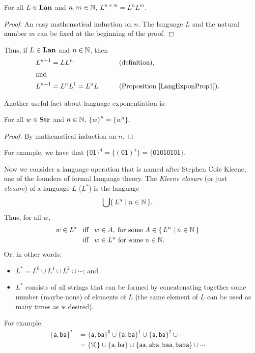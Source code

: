 \begin{proposition}
\label{LangExponProp1}
For all $L\in\mathbf{Lan}$ and $n,m\in\mathbb{N}$, $L^{n+m}=L^nL^m$.
\end{proposition}

\begin{proof}
An easy mathematical induction on $n$.  The language $L$ and the natural
number $m$ can be fixed at the beginning of the proof.
\end{proof}

Thus, if $L\in\mathbf{Lan}$ and $n\in\mathbb{N}$, then
\begin{alignat*}{2}
L^{n+1} &= LL^n && \qquad{\textrm{(definition)}}, \\
\intertext{and}
L^{n+1} &= L^nL^1 = L^nL && \qquad{\textrm{(Proposition~\ref{LangExponProp1})}} .
\end{alignat*}

Another useful fact about language exponentiation is:

\begin{proposition}
\label{LangExponProp2}
For all $w\in\mathbf{Str}$ and $n\in\mathbb{N}$, $\{w\}^n = \{w^n\}$.
\end{proposition}

\begin{proof}
By mathematical induction on $n$.
\end{proof}

For example, we have that $\{\mathsf{01}\}^4=\{(\mathsf{01})^4\}=
\{\mathsf{01010101}\}$.

Now we consider a language operation that is named after
Stephen Cole Kleene, one of the founders of formal language theory.
%
%
The \emph{Kleene closure} (or just \emph{closure}) of a language
$L$ ($L^*$) is the language
\begin{gather*}
\bigcup\{ \, L^n \mid n\in\mathbb{N} \, \}.
\end{gather*}
Thus, for all $w$,
\begin{align*}
w\in L^*&\mathrel{\;\;\allowbreak\mbox{iff}\allowbreak\;\;} w\in A,\;\allowbreak\mbox{for some}\allowbreak\;A\in\{ \, L^n \mid n\in\mathbb{N} \, \} \\
&\mathrel{\;\;\allowbreak\mbox{iff}\allowbreak\;\;} w\in L^n\;\allowbreak\mbox{for some}\allowbreak\;n\in\mathbb{N} .
\end{align*}
Or, in other words:
\begin{itemize}
\item $L^*=L^0\cup L^1\cup L^2\cup{\cdots}$; and

\item $L^*$ consists of all strings that can be formed by concatenating
together some number (maybe none) of elements of $L$ (the same element of
$L$ can be used as many times as is desired).
\end{itemize}
For example,
\begin{align*}
\mathsf{\{a,ba\}^*} &=
\mathsf{\{a,ba\}^0\cup\{a,ba\}^1\cup\{a,ba\}^2\cup\cdots} \\
&= \mathsf{\{\%\}\cup
   \{a,ba\}\cup
   \{aa,aba,baa,baba\}\cup\cdots}
\end{align*}

